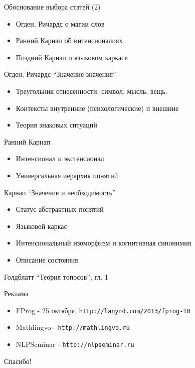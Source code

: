 \documentclass{beamer}
\begin{document}
\begin{frame}{Обоснование выбора статей (2)}
  \begin{itemize}
    \item Огден, Ричардс о магии слов
    \item Ранний Карнап об интенсионалиях
    \item Поздний Карнап о языковом каркасе
  \end{itemize}
\end{frame}


\begin{frame}{Огден, Ричардс ``Значение значения''}
  \begin{itemize}
    \item Треугольник отнесенности: символ, мысль, вещь.
    \item Контексты внутренние (психологические) и внешние
    \item Теория знаковых ситуаций
  \end{itemize}
\end{frame}

\begin{frame}{Ранний Карнап}
  \begin{itemize}
    \item Интенсионал и экстенсионал
    \item Универсальная иерархия понятий
  \end{itemize}
\end{frame}

\begin{frame}{Карнап ``Значение и необходимость''}
  \begin{itemize}
    \item Статус абстрактных понятий
    \item Языковой каркас
    \item Интенсиональный изоморфизм и когнитивная синонимия
    \item Описание состояния
  \end{itemize}
\end{frame}

\begin{frame}{Голдблатт ``Теория топосов'', гл. 1}
\end{frame}

\begin{frame}{Реклама}
  \begin{itemize}
    \item FProg - 25 октября, \texttt{http://lanyrd.com/2013/fprog-10}
    \item Mathlingvo - \texttt{http://mathlingvo.ru}
    \item NLPSeminar - \texttt{http://nlpseminar.ru}
  \end{itemize}
\end{frame}


\begin{frame}{}
    \thispagestyle{empty}
    \begin{center}
        {\large Спасибо!}
    \end{center}
\end{frame}


\end{document}
